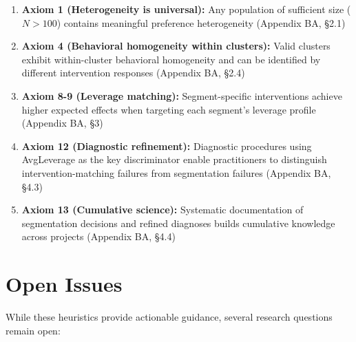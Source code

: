 \begin{enumerate}
\item \textbf{Axiom 1 (Heterogeneity is universal):} Any population of sufficient size ($N > 100$) contains meaningful preference heterogeneity (Appendix BA, §2.1)

\item \textbf{Axiom 4 (Behavioral homogeneity within clusters):} Valid clusters exhibit within-cluster behavioral homogeneity and can be identified by different intervention responses (Appendix BA, §2.4)

\item \textbf{Axiom 8-9 (Leverage matching):} Segment-specific interventions achieve higher expected effects when targeting each segment's leverage profile (Appendix BA, §3)

\item \textbf{Axiom 12 (Diagnostic refinement):} Diagnostic procedures using AvgLeverage as the key discriminator enable practitioners to distinguish intervention-matching failures from segmentation failures (Appendix BA, §4.3)

\item \textbf{Axiom 13 (Cumulative science):} Systematic documentation of segmentation decisions and refined diagnoses builds cumulative knowledge across projects (Appendix BA, §4.4)
\end{enumerate}


\section{Open Issues}
\label{sec:h-open-issues}

While these heuristics provide actionable guidance, several research questions remain open:

